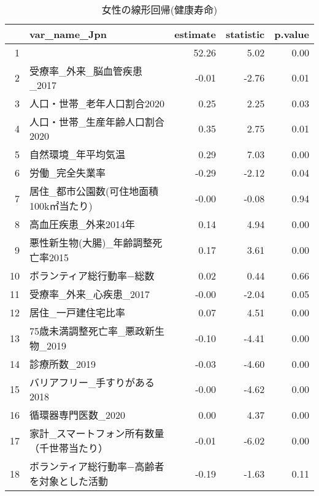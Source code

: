 \begin{table}[ht]
\centering
\begingroup\tiny
\begin{tabular}{rlrrr}
  \hline
 & var\_name\_Jpn & estimate & statistic & p.value \\ 
  \hline
1 &  & 52.26 & 5.02 & 0.00 \\ 
  2 & 受療率\_外来\_脳血管疾患\_2017 & -0.01 & -2.76 & 0.01 \\ 
  3 & 人口・世帯\_老年人口割合2020 & 0.25 & 2.25 & 0.03 \\ 
  4 & 人口・世帯\_生産年齢人口割合2020 & 0.35 & 2.75 & 0.01 \\ 
  5 & 自然環境\_年平均気温 & 0.29 & 7.03 & 0.00 \\ 
  6 & 労働\_完全失業率 & -0.29 & -2.12 & 0.04 \\ 
  7 & 居住\_都市公園数(可住地面積100k㎡当たり) & -0.00 & -0.08 & 0.94 \\ 
  8 & 高血圧疾患\_外来2014年 & 0.14 & 4.94 & 0.00 \\ 
  9 & 悪性新生物(大腸)\_年齢調整死亡率2015 & 0.17 & 3.61 & 0.00 \\ 
  10 & ボランティア総行動率−総数 & 0.02 & 0.44 & 0.66 \\ 
  11 & 受療率\_外来\_心疾患\_2017 & -0.00 & -2.04 & 0.05 \\ 
  12 & 居住\_一戸建住宅比率 & 0.07 & 4.51 & 0.00 \\ 
  13 & 75歳未満調整死亡率\_悪政新生物\_2019 & -0.10 & -4.41 & 0.00 \\ 
  14 & 診療所数\_2019 & -0.03 & -4.60 & 0.00 \\ 
  15 & バリアフリー\_手すりがある2018 & -0.00 & -4.62 & 0.00 \\ 
  16 & 循環器専門医数\_2020 & 0.00 & 4.37 & 0.00 \\ 
  17 & 家計\_スマートフォン所有数量（千世帯当たり） & -0.01 & -6.02 & 0.00 \\ 
  18 & ボランティア総行動率−高齢者を対象とした活動 & -0.19 & -1.63 & 0.11 \\ 
   \hline
\end{tabular}
\endgroup
\caption{女性の線形回帰(健康寿命)} 
\label{UsualHLMLEf}
\end{table}

